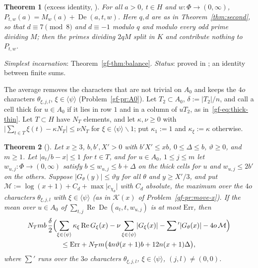 \documentclass[reqno]{amsart}
\theoremstyle{definition}
\theoremstyle{plain}
\newtheorem{theorem}{Theorem}[section]
\newcommand{\De}{\operatorname{De}}
\renewcommand{\Re}{\operatorname{Re}}
\begin{document}
\begin{theorem}[excess identity, {\cite[Prop.~3.3 and Cor.~3.4]{Adr}}]\label{thm:excess}
For all \(a > 0\), \(t \in H\) and \(w \colon \Phi \to (0,\infty)\), \(P_{t,w}(a) = M_w(a) + \De(a,t,w)\).  Here \(q, d\) are as in Theorem~\ref{thm:second}, so that \(d \equiv 7 \pmod 8\) and \(d \equiv -1\) modulo \(q\) and modulo every odd prime dividing \(M\); then the primes dividing \(2qM\) split in \(K\) and contribute nothing to \(P_{t,w}\).
\end{theorem}

\noindent\emph{Simplest incarnation}: Theorem~\ref{gf-thm:balance}.  \emph{Status}: proved in \cite{Adr}; an identity between finite sums.

The average removes the characters that are not trivial on \(A_0\) and keeps the \(4o\) characters \(\theta_{\xi,j,l}\), \(\xi \in \langle\psi\rangle\) (Problem~\ref{gf-pr:A0}).  Let \(T_2 \subset A_0\), \(\delta := \lvert T_2\rvert/n\), and call a cell thick for \(u \in A_0\) if it lies in row \(1\) and in a column of \(uT_2\), as in~\eqref{gf-eq:thick-thin}.  Let \(T \subset H\) have \(N_T\) elements, and let \(\kappa, \nu \ge 0\) with \(\lvert\sum_{t\in T}\xi(t) - \kappa N_T\rvert \le \nu N_T\) for \(\xi \in \langle\psi\rangle \smallsetminus 1\); put \(\kappa_1 := 1\) and \(\kappa_\xi := \kappa\) otherwise.

\begin{theorem}[{\cite[Lemma~4.1 and Thm.~4.2]{Adr}}]\label{thm:main-step}
Let \(x \ge 3\), \(b, b', X' > 0\) with \(b'X' \le xb\), \(0 \le \Delta \le b\), \(\vartheta \ge 0\), and \(m \ge 1\).  Let \(\lvert a_t/b - x \rvert \le 1\) for \(t \in T\), and for \(u \in A_0\), \(1 \le j \le m\) let \(w_{u,j} \colon \Phi \to (0,\infty)\) satisfy \(b \le w_{u,j} \le b + \Delta\) on the thick cells for \(u\) and \(w_{u,j} \le 2b'\) on the others.  Suppose \(\lvert G_\theta(y)\rvert \le \vartheta y\) for all \(\theta\) and \(y \ge X'/3\), and put \(\mathcal{M} := \log(x+1) + C_d + \max \lvert c_{\chi_\theta}\rvert\) with \(C_d\) absolute, the maximum over the \(4o\) characters \(\theta_{\xi,j,l}\) with \(\xi \in \langle\psi\rangle\) (as in \(\mathcal{K}(x)\) of Problem~\ref{gf-pr:move-x}).  If the mean over \(u \in A_0\) of \(\sum_{t,j}\Re\De(a_t, t, w_{u,j})\) is at most \(\mathrm{Err}\), then
\begin{multline*}
  N_T m b\,\frac{\delta}{2}\Bigl(\sum_{\xi\in\langle\psi\rangle}\kappa_\xi\Re G_\xi(x) - \nu\sum_{\xi\in\langle\psi\rangle}\lvert G_\xi(x)\rvert - \sum{}' \lvert G_\theta(x)\rvert - 4o\,\mathcal{M}\Bigr) \\
  \le \mathrm{Err} + N_T m\bigl(4n\vartheta(x+1)b + 12n(x+1)\Delta\bigr),
\end{multline*}
where \(\sum'\) runs over the \(3o\) characters \(\theta_{\xi,j,l}\), \(\xi \in \langle\psi\rangle\), \((j,l) \ne (0,0)\).
\end{theorem}
\end{document}
